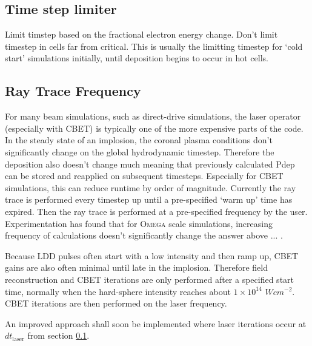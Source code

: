 \subsection{Time step limiter} \label{dtlaser}

Limit timstep based on the fractional electron energy change.
Don't limit timestep in cells far from critical.
This is usually the limitting timestep for `cold start' simulations initially, until deposition begins to occur in hot cells.

\subsection{Ray Trace Frequency}

For many beam simulations, such as direct-drive simulations, the laser operator (especially with CBET) is typically one of the more expensive parts of the code.
In the steady state of an implosion, the coronal plasma conditions don't significantly change on the global hydrodynamic timestep.
Therefore the deposition also doesn't change much meaning that previously calculated Pdep can be stored and reapplied on subsequent timesteps.
Especially for CBET simulations, this can reduce runtime by order of magnitude.
Currently the ray trace is performed every timestep up until a pre-specified `warm up' time has expired.
Then the ray trace is performed at a pre-specified frequency by the user.
Experimentation has found that for \textsc{Omega} scale simulations, increasing frequency of calculations doesn't significantly change the answer above ... .

Because LDD pulses often start with a low intensity and then ramp up, CBET gains are also often minimal until late in the implosion.
Therefore field reconstruction and CBET iterations are only performed after a specified start time, normally when the hard-sphere intensity reaches about $1\times 10^{14}$ $Wcm^{-2}$.
CBET iterations are then performed on the laser frequency.

An improved approach shall soon be implemented where laser iterations occur at $dt_{\text{laser}}$ from section \ref{dtlaser}.

